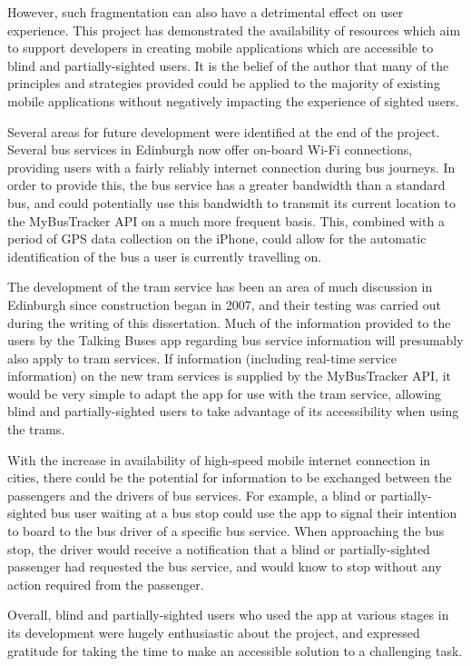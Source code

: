 \documentclass[10pt,twocolumn]{article}
\newcommand{\citep}[1]{}
\begin{document}
However, such fragmentation can also have a detrimental effect on user experience. This project has demonstrated the availability of resources which aim to support developers in creating mobile applications which are accessible to blind and partially-sighted users. It is the belief of the author that many of the principles and strategies provided could be applied to the majority of existing mobile applications without negatively impacting the experience of sighted users.

Several areas for future development were identified at the end of the project. Several bus services in Edinburgh now offer on-board Wi-Fi connections, providing users with a fairly reliably internet connection during bus journeys\citep{lothianWiFi}. In order to provide this, the bus service has a greater bandwidth than a standard bus, and could potentially use this bandwidth to transmit its current location to the MyBusTracker API on a much more frequent basis. This, combined with a period of GPS data collection on the iPhone, could allow for the automatic identification of the bus a user is currently travelling on.

The development of the tram service has been an area of much discussion in Edinburgh since construction began in 2007, and their testing was carried out during the writing of this dissertation. Much of the information provided to the users by the Talking Buses app regarding bus service information will presumably also apply to tram services. If information (including real-time service information) on the new tram services is supplied by the MyBusTracker API, it would be very simple to adapt the app for use with the tram service, allowing blind and partially-sighted users to take advantage of its accessibility when using the trams.

With the increase in availability of high-speed mobile internet connection in cities, there could be the potential for information to be exchanged between the passengers and the drivers of bus services. For example, a blind or partially-sighted bus user waiting at a bus stop could use the app to signal their intention to board to the bus driver of a specific bus service. When approaching the bus stop, the driver would receive a notification that a blind or partially-sighted passenger had requested the bus service, and would know to stop without any action required from the passenger.

Overall, blind and partially-sighted users who used the app at various stages in its development were hugely enthusiastic about the project, and expressed gratitude for taking the time to make an accessible solution to a challenging task.
\end{document}
